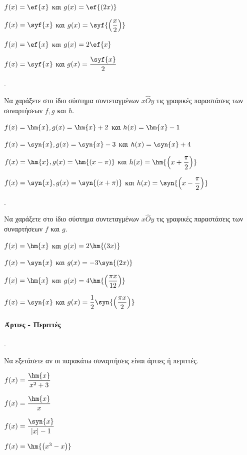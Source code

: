 \documentclass[11pt,a4paper,twocolumn]{article}
\newcounter{askhsh}
\newcommand{\askhsh}{\large\theaskhsh.\ \addtocounter{askhsh}{1}}
\begin{document}
\begin{alist}
\item $f(x)=\ef{x}$ και $g(x)=\ef{(2x)}$
\item $f(x)=\syf{x}$ και $g(x)=\syf{\left(\dfrac{x}{2}\right)}$
\item $f(x)=\ef{x}$ και $g(x)=2\ef{x}$
\item $f(x)=\syf{x}$ και $g(x)=\dfrac{\syf{x}}{2}$
\end{alist}
\askhsh Να χαράξετε στο ίδιο σύστημα συντεταγμένων $x\hat{O}y$ τις γραφικές παραστάσεις των συναρτήσεων $f,g$ και $h$.
\begin{alist}
\item $f(x)=\hm{x},g(x)=\hm{x}+2$ και $h(x)=\hm{x}-1$
\item $f(x)=\syn{x},g(x)=\syn{x}-3$ και $h(x)=\syn{x}+4$
\item $f(x)=\hm{x},g(x)=\hm{(x-\pi)}$ και $h(x)=\hm{\left(x+\dfrac{\pi}{2}\right)}$
\item $f(x)=\syn{x},g(x)=\syn{(x+\pi)}$ και $h(x)=\syn{\left(x-\dfrac{\pi}{2}\right)}$
\end{alist}
\askhsh Να χαράξετε στο ίδιο σύστημα συντεταγμένων $x\hat{O}y$ τις γραφικές παραστάσεις των συναρτήσεων $f$ και $g$.
\begin{alist}
\item $f(x)=\hm{x}$ και $g(x)=2\hm{(3x)}$
\item $f(x)=\syn{x}$ και $g(x)=-3\syn{(2x)}$
\item $f(x)=\hm{x}$ και $g(x)=4\hm{\left(\dfrac{\pi x}{12}\right)}$
\item $f(x)=\syn{x}$ και $g(x)=\dfrac{1}{2}\syn{\left(\dfrac{\pi x}{2}\right)}$
\end{alist}
\paragraph{Άρτιες - Περιττές}
\askhsh Να εξετάσετε αν οι παρακάτω συναρτήσεις είναι άρτιες ή περιττές.
\begin{multicols}{2}
\begin{alist}
\item $f(x)=\dfrac{\hm{x}}{x^2+3}$
\item $f(x)=\dfrac{\hm{x}}{x}$
\item $f(x)=\dfrac{\syn{x}}{|x|-1}$
\item $f(x)=\hm{\left(x^3-x\right)}$
\end{alist}
\end{multicols}
\end{document}
